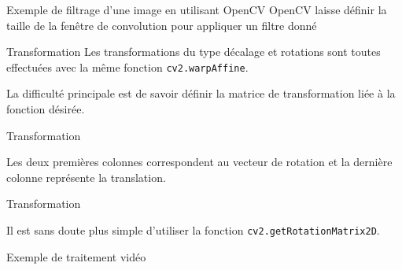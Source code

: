 \begin{frame}{Exemple de filtrage d'une image en utilisant OpenCV}
    OpenCV laisse définir la taille de la fenêtre de convolution pour appliquer un filtre donné

\end{frame}

\begin{frame}{Transformation}
    Les transformations du type décalage et rotations sont toutes effectuées avec la même fonction \texttt{cv2.warpAffine}.
    
    La difficulté principale est de savoir définir la matrice de transformation liée à la fonction désirée.
    
\end{frame}

\begin{frame}{Transformation}
    
    
    Les deux premières colonnes correspondent au vecteur de rotation et la dernière colonne représente la translation.
\end{frame}

\begin{frame}{Transformation}
    
    Il est sans doute plus simple d'utiliser la fonction \texttt{cv2.getRotationMatrix2D}.
    
    
\end{frame}


\begin{frame}{Exemple de traitement vidéo}
\end{frame}